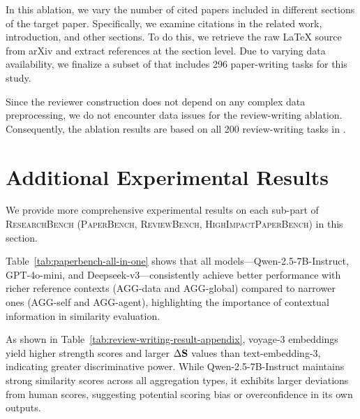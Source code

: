In this ablation, we vary the number of cited papers included in different sections of the target paper. Specifically, we examine citations in the related work, introduction, and other sections. To do this, we retrieve the raw \LaTeX{} source from arXiv and extract references at the section level. Due to varying data availability, we finalize a subset of \benchname that includes 296 paper-writing tasks for this study.

Since the reviewer construction does not depend on any complex data preprocessing, we do not encounter data issues for the review-writing ablation. Consequently, the ablation results are based on all 200 review-writing tasks in \benchname.


\section{Additional Experimental Results}
\label{additional-exp-results}
We provide more comprehensive experimental results on each sub-part of \textsc{ResearchBench} (\textsc{PaperBench}, \textsc{ReviewBench}, \textsc{HighImpactPaperBench}) in this section.

Table~\ref{tab:paperbench-all-in-one} shows that all models—Qwen-2.5-7B-Instruct, GPT-4o-mini, and Deepseek-v3—consistently achieve better performance with richer reference contexts (AGG-data and AGG-global) compared to narrower ones (AGG-self and AGG-agent), highlighting the importance of contextual information in similarity evaluation.

As shown in Table~\ref{tab:review-writing-result-appendix}, voyage-3 embeddings yield higher strength scores and larger $\Delta \mathbf{S}$ values than text-embedding-3, indicating greater discriminative power. While Qwen-2.5-7B-Instruct maintains strong similarity scores across all aggregation types, it exhibits larger deviations from human scores, suggesting potential scoring bias or overconfidence in its own outputs.



